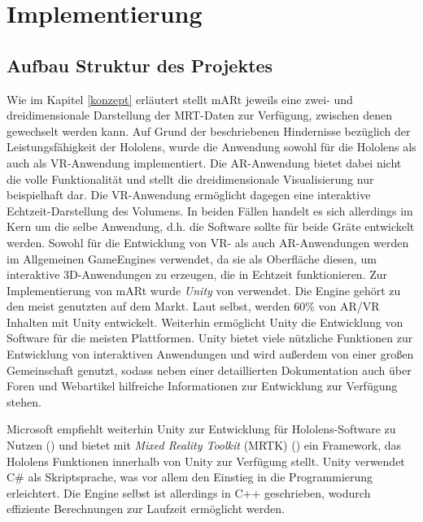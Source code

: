 
\chapter{Implementierung}
\label{implementierung}

\section{Aufbau Struktur des Projektes}

Wie im Kapitel \ref{konzept} erläutert stellt mARt jeweils eine zwei- und dreidimensionale Darstellung der MRT-Daten zur Verfügung, zwischen denen gewechselt werden kann. Auf Grund der beschriebenen Hindernisse bezüglich der Leistungsfähigkeit der Hololens, wurde die Anwendung sowohl für die Hololens als auch als VR-Anwendung implementiert. Die AR-Anwendung bietet dabei nicht die volle Funktionalität und stellt die dreidimensionale Visualisierung nur beispielhaft dar. Die VR-Anwendung ermöglicht dagegen eine interaktive Echtzeit-Darstellung des Volumens. In beiden Fällen handelt es sich allerdings im Kern um die selbe Anwendung, d.h. die Software sollte für beide Gräte entwickelt werden. 
Sowohl für die Entwicklung von VR- als auch AR-Anwendungen werden im Allgemeinen GameEngines verwendet, da sie als Oberfläche diesen, um interaktive 3D-Anwendungen zu erzeugen, die in Echtzeit funktionieren. 
Zur Implementierung von mARt wurde \textit{Unity} von \citet{unity} verwendet. Die Engine gehört zu den meist genutzten auf dem Markt. Laut \citet{unityRelations} selbst, werden 60\% von AR/VR Inhalten mit Unity entwickelt. Weiterhin ermöglicht Unity die Entwicklung von Software für die meisten Plattformen. Unity bietet viele nützliche Funktionen zur Entwicklung von interaktiven Anwendungen und wird außerdem von einer großen  Gemeinschaft genutzt, sodass neben einer detaillierten Dokumentation auch über Foren und Webartikel hilfreiche Informationen zur Entwicklung zur Verfügung stehen.

Microsoft empfiehlt weiterhin Unity zur Entwicklung für Hololens-Software zu Nutzen (\citet{unityHololens}) und bietet mit \textit{Mixed Reality Toolkit} (MRTK) (\citet{holoToolkit}) ein Framework, das Hololens Funktionen innerhalb von Unity zur Verfügung stellt.
Unity verwendet C\# als Skriptsprache, was vor allem den Einstieg in die Programmierung erleichtert. Die Engine selbst ist allerdings in C++ geschrieben, wodurch effiziente Berechnungen zur Laufzeit ermöglicht werden.

